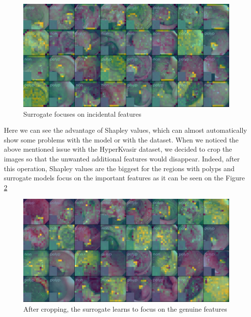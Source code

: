 \documentclass[magisterska,en]{pracamgr}
\begin{document}
\begin{figure}[H]
\centering
\includegraphics[scale=0.5]{./images/shap_gastro_edges.png}
\caption{Surrogate focuses on incidental features}
\label{Shapley values gastro}
\end{figure}




Here we can see the advantage of Shapley values, which can almost automatically show some problems with the model or with the dataset.
When we noticed the above mentioned issue with the HyperKvasir dataset, we decided to crop the images so that the unwanted additional features would disappear. Indeed, after this operation, Shapley values are the biggest for the regions with polyps and surrogate models focus on the important features as it can be seen on the Figure 
\ref{Shapley values for 196 players cropped gastro}

\begin{figure}[H]
\centering
\includegraphics[scale=0.5]{./images/cropped_shap_gastro.png}
\caption{After cropping, the surrogate learns to focus on the genuine features}
\label{Shapley values for 196 players cropped gastro}
\end{figure}
\end{document}

